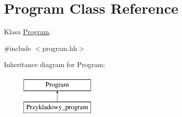 \hypertarget{class_program}{\section{Program Class Reference}
\label{class_program}
}


Klasa \hyperlink{class_program}{Program}.  




{\ttfamily \#include $<$program.\+hh$>$}

Inheritance diagram for Program\+:\begin{figure}[H]
\begin{center}
\leavevmode
\includegraphics[height=2.000000cm]{class_program}
\end{center}
\end{figure}
